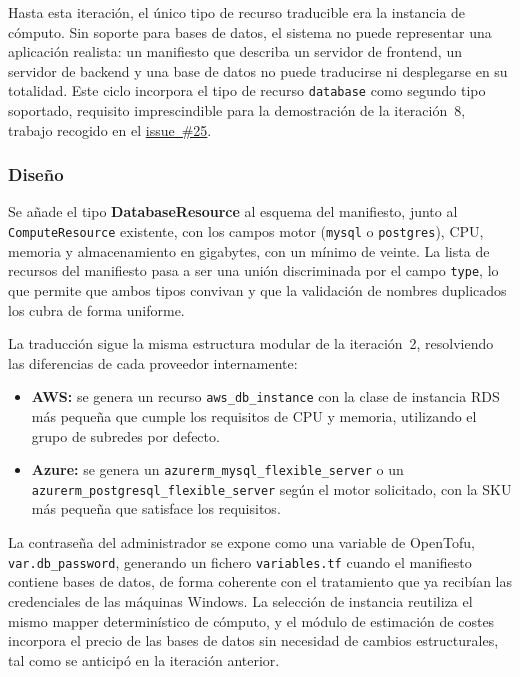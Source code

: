 Hasta esta iteración, el único tipo de recurso traducible era la instancia de cómputo. Sin
soporte para bases de datos, el sistema no puede representar una aplicación realista: un
manifiesto que describa un servidor de frontend, un servidor de backend y una base de datos no
puede traducirse ni desplegarse en su totalidad. Este ciclo incorpora el tipo de recurso
\texttt{database} como segundo tipo soportado, requisito imprescindible para la demostración de
la iteración~8, trabajo recogido en el
\href{https://github.com/lucpez/cloudporter/issues/25}{issue~\#25}.

\subsubsection{Diseño}

Se añade el tipo \textbf{DatabaseResource} al esquema del manifiesto, junto al
\texttt{ComputeResource} existente, con los campos motor (\texttt{mysql} o \texttt{postgres}),
CPU, memoria y almacenamiento en gigabytes, con un mínimo de veinte. La lista de recursos del
manifiesto pasa a ser una unión discriminada por el campo \texttt{type}, lo que permite que
ambos tipos convivan y que la validación de nombres duplicados los cubra de forma uniforme.

La traducción sigue la misma estructura modular de la iteración~2, resolviendo las diferencias
de cada proveedor internamente:

\begin{itemize}
    \item \textbf{AWS:} se genera un recurso \texttt{aws\_db\_instance} con la clase de instancia
    RDS más pequeña que cumple los requisitos de CPU y memoria, utilizando el grupo de subredes
    por defecto.
    \item \textbf{Azure:} se genera un \texttt{azurerm\_mysql\_flexible\_server} o un
    \texttt{azurerm\_postgresql\_flexible\_server} según el motor solicitado, con la SKU más
    pequeña que satisface los requisitos.
\end{itemize}

La contraseña del administrador se expone como una variable de OpenTofu, \texttt{var.db\_password},
generando un fichero \texttt{variables.tf} cuando el manifiesto contiene bases de datos, de forma
coherente con el tratamiento que ya recibían las credenciales de las máquinas Windows. La
selección de instancia reutiliza el mismo mapper determinístico de cómputo, y el módulo de
estimación de costes incorpora el precio de las bases de datos sin necesidad de cambios
estructurales, tal como se anticipó en la iteración anterior.

